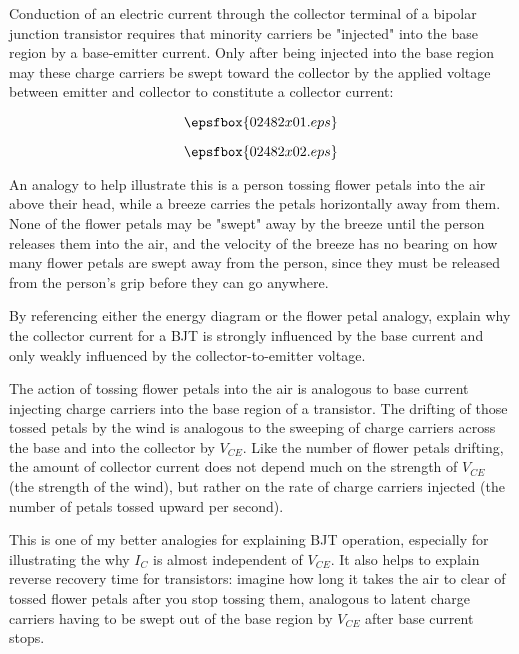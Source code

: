 

Conduction of an electric current through the collector terminal of a bipolar junction transistor requires that minority carriers be "injected" into the base region by a base-emitter current.  Only after being injected into the base region may these charge carriers be swept toward the collector by the applied voltage between emitter and collector to constitute a collector current:

$$\epsfbox{02482x01.eps}$$

\vskip 10pt

$$\epsfbox{02482x02.eps}$$

An analogy to help illustrate this is a person tossing flower petals into the air above their head, while a breeze carries the petals horizontally away from them.  None of the flower petals may be "swept" away by the breeze until the person releases them into the air, and the velocity of the breeze has no bearing on how many flower petals are swept away from the person, since they must be released from the person's grip before they can go anywhere.

By referencing either the energy diagram or the flower petal analogy, explain why the collector current for a BJT is strongly influenced by the base current and only weakly influenced by the collector-to-emitter voltage.







The action of tossing flower petals into the air is analogous to base current injecting charge carriers into the base region of a transistor.  The drifting of those tossed petals by the wind is analogous to the sweeping of charge carriers across the base and into the collector by $V_{CE}$.  Like the number of flower petals drifting, the amount of collector current does not depend much on the strength of $V_{CE}$ (the strength of the wind), but rather on the rate of charge carriers injected (the number of petals tossed upward per second).







This is one of my better analogies for explaining BJT operation, especially for illustrating the why $I_C$ is almost independent of $V_{CE}$.  It also helps to explain reverse recovery time for transistors: imagine how long it takes the air to clear of tossed flower petals after you stop tossing them, analogous to latent charge carriers having to be swept out of the base region by $V_{CE}$ after base current stops.




